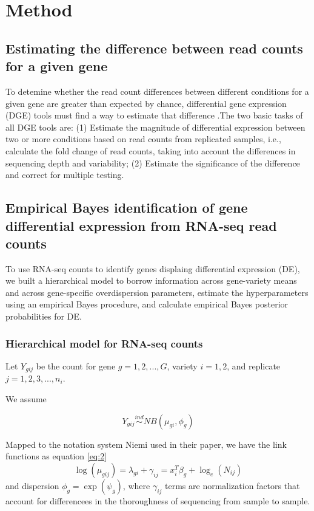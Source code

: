 \chapter{Method}

\section{Estimating the difference between read counts for a given gene}

To detemine whether the read count differences between different conditions for a given gene are greater than expected by chance, differential gene expression (DGE) tools must find a way to estimate that difference \citep{dundar2015introduction}.The two basic tasks of all DGE tools are: (1) Estimate the magnitude of differential expression between two or more conditions based on read counts from replicated samples, i.e., calculate the fold change of read counts, taking into account the differences in sequencing depth and variability; (2) Estimate the significance of the difference and correct for multiple testing. 

\section{Empirical Bayes identification of gene differential expression from RNA-seq read counts}


To use RNA-seq counts to identify genes displaing differential expression (DE), we built a hierarchical model to borrow information across gene-variety means and across gene-specific overdispersion parameters, estimate the hyperparameters using an empirical Bayes procedure, and calculate empirical Bayes posterior probabilities for DE. 

\subsection{Hierarchical model for RNA-seq counts}

Let $Y_{gij}$ be the count for gene $g=1,2,..., G$, variety $i=1,2$, and replicate $j=1,2,3,...,n_i$.

We assume

\begin{equation}
\label{eq:1}
Y_{gij} \stackrel{ind}{\sim} NB(\mu_{gi}, \phi_g)
\end{equation}

Mapped to the notation system Niemi used in their paper\citep{niemi2015empirical}, we have the link functions as equation \ref{eq:2}
\begin{equation}
\label{eq:2}
\log(\mu_{gij}) = \lambda_{gi} + \gamma_{ij} = x_i^T \beta_g + \log_e (N_{ij})
\end{equation}
and dispersion $\phi_g = \exp{(\psi_g)}$, where $\gamma_{ij}$ terms are normalization factors that account for differencees in the thoroughness of sequencing from sample to sample. 

